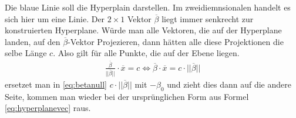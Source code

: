 \documentclass[
]{article}
\begin{document}
Die blaue Linie soll die Hyperplain darstellen. Im zweidiemnsionalen
handelt es sich hier um eine Linie. Der \(2 \times 1\) Vektor
\(\overline{\beta}\) liegt immer senkrecht zur konstruierten Hyperplane.
Würde man alle Vektoren, die auf der Hyperplane landen, auf den
\(\overline{\beta}\)-Vektor Projezieren, dann hätten alle diese
Projektionen die selbe Länge \(c\). Also gilt für alle Punkte, die auf
der Ebene liegen. \begin{align}
\frac{\overline \beta}{||\overline{\beta}||}\cdot \overline{x}=c \Leftrightarrow \overline{\beta}\cdot \overline{x}=c \cdot ||\overline{\beta}||\label{eq:betanull}
\end{align} ersetzet man in \eqref{eq:betanull}
\(c \cdot ||\overline{\beta}||\) mit \(-\beta_0\) und zieht dies dann
auf die andere Seite, kommen man wieder bei der ursprünglichen Form aus
Formel \eqref{eq:hyperplanevec} raus.
\end{document}
